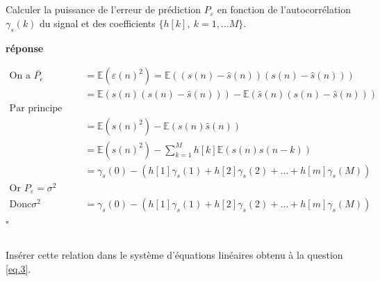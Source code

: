 \documentclass{article}
\newcommand{\debutrep}[1]{\color{blue}\begin{center} \hrulefill \textbf{ #1 } \hrulefill \end{center} }
\newcommand{\finrep}{\vspace*{5mm}\hfill $\square$\color{black}\vspace*{5mm}}
\begin{document}
\subsection{}
Calculer la puissance de l'erreur de prédiction $P_{\varepsilon}$ en fonction de l'autocorrélation $\gamma_s(k)$ du signal et des coefficients $\{h[k],~k=1,\ldots M\}$.\\


\debutrep{réponse}
\[
\begin{split}
    \text{On a } \bar{P_\epsilon} &= \mathbb{E}(\varepsilon(n)^2)=\mathbb{E}((s(n)-\hat{s}(n))(s(n)-\hat{s}(n)))\\
    &= \mathbb{E}(s(n)(s(n)-\hat{s}(n)))-\mathbb{E}(\hat{s}(n)(s(n)-\hat{s}(n)))\\
    \text{Par principe d'orthogonalité:}\\
    &= \mathbb{E}(s(n)^2)-\mathbb{E}(s(n)\hat{s}(n))\\
    &= \mathbb{E}(s(n)^2)-\sum_{k=1}^M h[k]\mathbb{E}(s(n)s(n-k))\\
    &= \gamma_s(0)-(h[1]\gamma_s (1)+h[2]\gamma_s (2)+\hdots+h[m]\gamma_s (M)) \\
    \text{Or } P_\varepsilon = \sigma^2 \\
    \text{Donc} \sigma^2 &= \gamma_s(0)-(h[1]\gamma_s (1)+h[2]\gamma_s (2)+\hdots+h[m]\gamma_s (M))
\end{split}
\]
\finrep

\subsection{}
\label{eq.5}
Insérer cette relation dans le système 	d'équations linéaires  obtenu à la question \ref{eq.3}.\\
\end{document}
